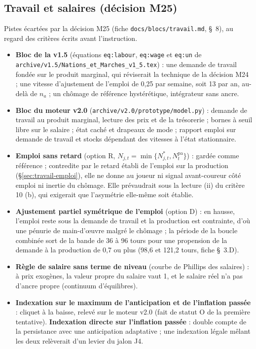 \documentclass[11pt,a4paper]{article}
\begin{document}
\subsection*{Travail et salaires (décision M25)}
Pistes écartées par la décision M25 (fiche \nolinkurl{docs/blocs/travail.md}, \S~8), au regard des critères écrits avant l'instruction.
\begin{itemize}
\item \textbf{Bloc de la v1.5} (équations \texttt{eq:labour}, \texttt{eq:wage} et \texttt{eq:un} de \nolinkurl{archive/v1.5/Nations_et_Marches_v1_5.tex}) : une demande de travail fondée sur le produit marginal, qui réviserait la technique de la décision M24 ; une vitesse d'ajustement de l'emploi de 0,25 par semaine, soit 13 par an, au-delà de $n_a$ ; un chômage de référence hystérétique, intégrateur sans ancre.
\item \textbf{Bloc du moteur v2.0} (\texttt{archive/v2.0/prototype/model.py}) : demande de travail au produit marginal, lecture des prix et de la trésorerie ; bornes à seuil libre sur le salaire ; état caché et drapeaux de mode ; rapport emploi sur demande de travail et stocks dépendant des vitesses à l'état stationnaire.
\item \textbf{Emploi sans retard} (option R, $N_{j,t} = \min\{N^{\ast}_{j,t}, N^{\mathrm{pa}}_t\}$) : gardée comme référence ; contredite par le retard établi de l'emploi sur la production (\S\ref{sec:travail-emploi}), elle ne donne au joueur ni signal avant-coureur côté emploi ni inertie du chômage. Elle prévaudrait sous la lecture (ii) du critère 10 (b), qui exigerait que l'asymétrie elle-même soit établie.
\item \textbf{Ajustement partiel symétrique de l'emploi} (option D) : en hausse, l'emploi reste sous la demande de travail et la production est contrainte, d'où une pénurie de main-d'œuvre malgré le chômage ; la période de la boucle combinée sort de la bande de 36 à 96 tours pour une propension de la demande à la production de 0,7 ou plus (98,6 et 121,2 tours, fiche \S~3.D).
\item \textbf{Règle de salaire sans terme de niveau} (courbe de Phillips des salaires) : à prix exogènes, la valeur propre du salaire vaut 1, et le salaire réel n'a pas d'ancre propre (continuum d'équilibres).
\item \textbf{Indexation sur le maximum de l'anticipation et de l'inflation passée} : cliquet à la baisse, relevé sur le moteur v2.0 (fait de statut O de la première tentative). \textbf{Indexation directe sur l'inflation passée} : double compte de la persistance avec une anticipation adaptative ; une indexation légale mêlant les deux relèverait d'un levier du jalon J4.

\end{itemize}
\end{document}
